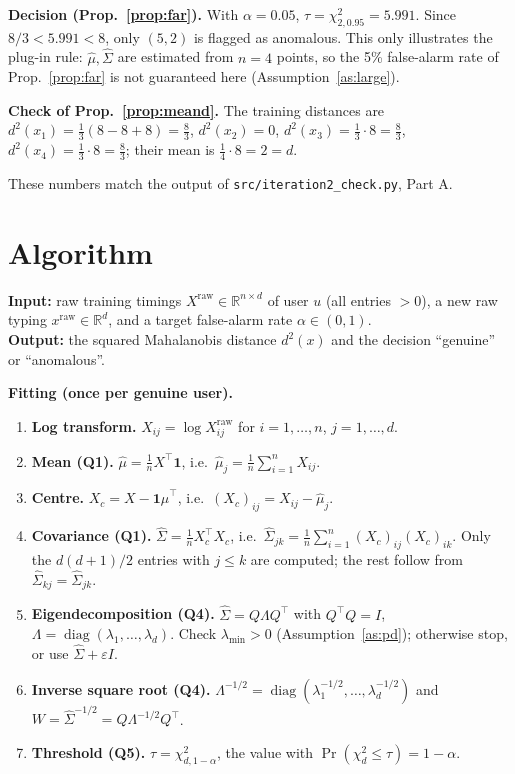 \documentclass[11pt]{article}
\theoremstyle{definition}
\newcommand{\R}{\mathbb{R}}
\newcommand{\T}{^{\top}}
\newcommand{\diag}{\operatorname{diag}}
\begin{document}
\textbf{Decision (Prop.~\ref{prop:far}).} With $\alpha=0.05$, $\tau=\chi^2_{2,0.95}=5.991$. Since $8/3<5.991<8$, only $(5,2)$ is flagged as anomalous. This only illustrates the plug-in rule: $\hat\mu,\hat\Sigma$ are estimated from $n=4$ points, so the 5\% false-alarm rate of Prop.~\ref{prop:far} is not guaranteed here (Assumption~\ref{as:large}).

\textbf{Check of Prop.~\ref{prop:meand}.} The training distances are $d^2(x_1)=\tfrac13(8-8+8)=\tfrac83$, $d^2(x_2)=0$, $d^2(x_3)=\tfrac13\cdot8=\tfrac83$, $d^2(x_4)=\tfrac13\cdot8=\tfrac83$; their mean is $\tfrac14\cdot8=2=d$.

These numbers match the output of \texttt{src/iteration2\_check.py}, Part A.

\section{Algorithm}
\textbf{Input:} raw training timings $X^{\text{raw}}\in\R^{n\times d}$ of user $u$ (all entries $>0$), a new raw typing $x^{\text{raw}}\in\R^d$, and a target false-alarm rate $\alpha\in(0,1)$.\\
\textbf{Output:} the squared Mahalanobis distance $d^2(x)$ and the decision ``genuine'' or ``anomalous''.

\medskip\noindent\textbf{Fitting (once per genuine user).}
\begin{enumerate}[label=(\arabic*), start=0, leftmargin=*]
\item \textbf{Log transform.} $X_{ij}=\log X^{\text{raw}}_{ij}$ for $i=1,\dots,n$, $j=1,\dots,d$.
\item \textbf{Mean (Q1).} $\hat\mu=\frac1n X\T\mathbf 1$, i.e.\ $\hat\mu_j=\frac1n\sum_{i=1}^n X_{ij}$.
\item \textbf{Centre.} $X_c=X-\mathbf 1\hat\mu\T$, i.e.\ $(X_c)_{ij}=X_{ij}-\hat\mu_j$.
\item \textbf{Covariance (Q1).} $\hat\Sigma=\frac1n X_c\T X_c$, i.e.\ $\hat\Sigma_{jk}=\frac1n\sum_{i=1}^n(X_c)_{ij}(X_c)_{ik}$. Only the $d(d+1)/2$ entries with $j\le k$ are computed; the rest follow from $\hat\Sigma_{kj}=\hat\Sigma_{jk}$.
\item \textbf{Eigendecomposition (Q4).} $\hat\Sigma=Q\Lambda Q\T$ with $Q\T Q=I$, $\Lambda=\diag(\lambda_1,\dots,\lambda_d)$. Check $\lambda_{\min}>0$ (Assumption~\ref{as:pd}); otherwise stop, or use $\hat\Sigma+\varepsilon I$.
\item \textbf{Inverse square root (Q4).} $\Lambda^{-1/2}=\diag(\lambda_1^{-1/2},\dots,\lambda_d^{-1/2})$ and $W=\hat\Sigma^{-1/2}=Q\Lambda^{-1/2}Q\T$.
\item \textbf{Threshold (Q5).} $\tau=\chi^2_{d,1-\alpha}$, the value with $\Pr(\chi^2_d\le\tau)=1-\alpha$.
\end{enumerate}
\end{document}
